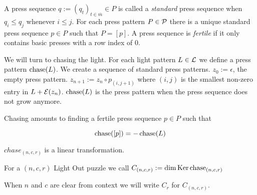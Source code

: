 A press sequence $q:=(q_{t})_{t\in\overline{m}}\in P$ is called a \emph{standard} press sequence when
$q_{i}\leq q_{j}$ whenever $i \leq j$. For each press pattern $P\in\mathcal{P}$ there is a unique standard 
press sequence $p\in P$ such that $P = [p]$.
A press sequence is \emph{fertile} if it only contains basic presses with a row index of 0.

We will turn to chasing the light. For each light pattern $L\in\mathcal{L}$ we define a press pattern
$\operatorname{chase}(L)$. We create a sequence of standard press patterns. $z_{0} := \epsilon$, the empty
press pattern. $z_{n+1} := z_{n} \circ p_{(i,j+1)}$ where $(i,j)$ is the smallest non-zero entry
in $L+\mathcal{E}(z_{n})$. $\operatorname{chase}(L)$ is the press pattern when the press sequence does not grow anymore.

Chasing amounts to finding a fertile press sequence $p\in P$ such that

\[
\operatorname{chase}([p]) = -\operatorname{chase}(L)
\]

$chase_{(n,c,r)}$ is a linear transformation.

\begin{definition}
    For a $(n,c,r)$ Light Out puzzle we call $C_{(n,c,r)} := \operatorname{dim} \operatorname{Ker} \operatorname{chase}_{(n,c,r)}$
\end{definition}

When $n$ and $c$ are clear from context we will write $C_{r}$ for $C_{(n,c,r)}$.